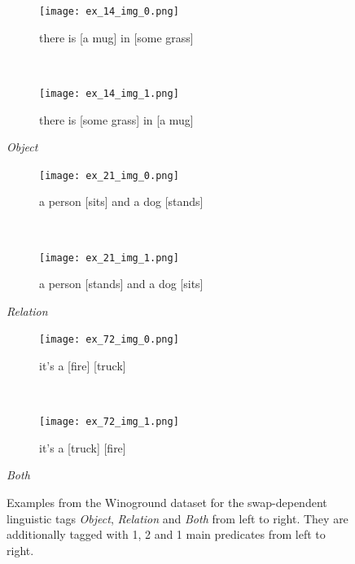 \begin{figure}[ht]
\centering
    \begin{minipage}[t]{.30\textwidth}
        \begin{subfigure}[t]{\textwidth}
        \centering
        \texttt{[image: ex\_14\_img\_0.png]}
        \caption{there is [a mug] in [some grass]}
        \end{subfigure}\\
        \begin{subfigure}[t]{\textwidth}
        \centering
        \texttt{[image: ex\_14\_img\_1.png]}
        \caption{there is [some grass] in [a mug]}
        \end{subfigure}%
        \caption*{\textit{Object}}
    \end{minipage}
    \hfill
    \begin{minipage}[t]{.30\textwidth}
        \begin{subfigure}[t]{\textwidth}
        \centering
        \texttt{[image: ex\_21\_img\_0.png]}
        \caption{a person [sits] and a dog [stands]}
        \end{subfigure}\\
        \begin{subfigure}[t]{\textwidth}
        \centering
        \texttt{[image: ex\_21\_img\_1.png]}
        \caption{a person [stands] and a dog [sits]}
        \end{subfigure}%
        \caption*{\textit{Relation}}
    \end{minipage}
    \hfill
    \begin{minipage}[t]{.30\textwidth}
        \begin{subfigure}[t]{\textwidth}
        \centering
        \texttt{[image: ex\_72\_img\_0.png]}
        \caption{it's a [fire] [truck]}
        \end{subfigure}\\
        \begin{subfigure}[t]{\textwidth}
        \centering
        \texttt{[image: ex\_72\_img\_1.png]}
        \caption{it's a [truck] [fire]}
        \end{subfigure}%
        \caption*{\textit{Both}}
    \end{minipage}%
    \caption{Examples from the Winoground dataset for the swap-dependent linguistic tags \textit{Object}, \textit{Relation} and \textit{Both} from left to right. They are additionally tagged with 1, 2 and 1 main predicates from left to right.}
    \label{fig:winoground-examples-linguistic}
\end{figure}


